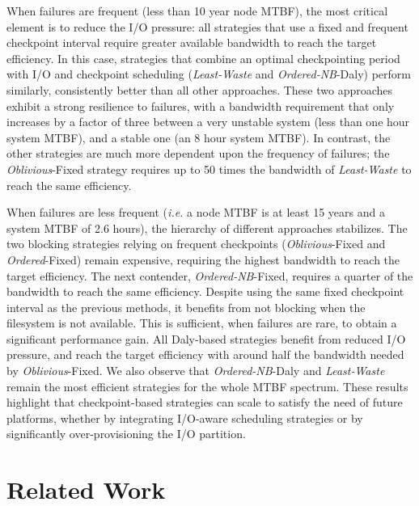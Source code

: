 \documentclass[conference,nofonttune]{IEEEtran}
\newcommand{\ie}[0]{\emph{i.e.}\xspace}
\newcommand{\nocoop}{\emph{Oblivious}\xspace}
\newcommand{\fifoblock}{\emph{Ordered}\xspace}
\newcommand{\fifononblock}{\emph{Ordered-NB}\xspace}
\newcommand{\leastwaste}{\emph{Least-Waste}\xspace}
\def\propfixed{\nocoop-Fixed\xspace}
\def\bfifofixed{\fifoblock-Fixed\xspace}
\def\fifofixed{\fifononblock-Fixed\xspace}
\def\fifodaly{\fifononblock-Daly\xspace}
\def\cooperative{\leastwaste}
\begin{document}
When failures are frequent (less than 10 year node MTBF), the most critical
element is to reduce the I/O pressure: all strategies that use a fixed and
frequent checkpoint interval require greater available bandwidth to reach the
target efficiency.  In this case, strategies that combine an optimal
checkpointing period with I/O and checkpoint scheduling (\cooperative and
\fifodaly) perform similarly, consistently better than all other approaches.
These two approaches exhibit a strong resilience to failures, with a bandwidth
requirement that only increases by a factor of three between a very unstable system
(less than one hour system MTBF), and a stable one (an 8 hour system MTBF). In
contrast, the other strategies are much more dependent upon the frequency of
failures; the \propfixed strategy requires up to 50 times the bandwidth of
\cooperative to reach the same efficiency.

When failures are less frequent (\ie a node MTBF is at least 15 years
and a system MTBF of 2.6 hours), the hierarchy of different
approaches stabilizes. The two blocking strategies relying on
frequent checkpoints (\propfixed and \bfifofixed) remain expensive,
requiring the highest bandwidth to reach the target
efficiency. %
The next contender, \fifofixed, requires a quarter of the  bandwidth
to reach the same efficiency.
Despite using the same fixed checkpoint interval as the previous methods, it
benefits from not blocking when the filesystem is not available.
This is sufficient, when failures are rare, to obtain a significant
performance gain. %
All Daly-based strategies benefit from reduced I/O pressure, and reach the
target efficiency with around half the bandwidth needed by \propfixed.
We also observe that \fifodaly and \leastwaste remain the most efficient strategies
for the whole MTBF spectrum. These
results highlight that checkpoint-based strategies can scale to
satisfy the need of future platforms, whether by integrating I/O-aware scheduling
strategies or by significantly over-provisioning the I/O partition.



\section{Related Work}\label{sec:related}
\end{document}
